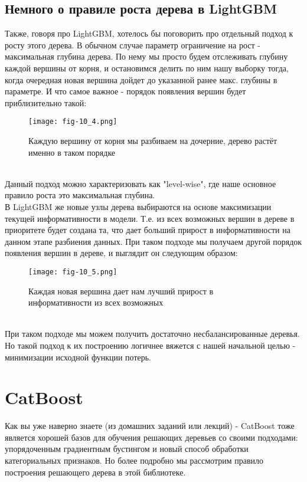 \documentclass[12pt,fleqn]{article}
\begin{document}
\subsection{Немного о правиле роста дерева в LightGBM}
Также, говоря про LightGBM, хотелось бы поговорить про отдельный подход к росту этого дерева. В обычном случае параметр ограничение на рост - максимальная глубина дерева. По нему мы просто будем отслеживать глубину каждой вершины от корня, и остановимся делить по ним нашу выборку тогда, когда очередная новая вершина дойдет до указанной ранее макс. глубины в параметре. И что самое важное - порядок появления вершин будет приблизительно такой:
\begin{figure}[h]
	\centering
	\texttt{[image: fig-10\_4.png]}
	\caption{Каждую вершину от корня мы разбиваем на дочерние, дерево растёт именно в таком порядке}
	\label{fig:terms_4}
\end{figure}\\
Данный подход можно характеризовать как "level-wise", где наше основное правило роста это максимальная глубина.\\

В LightGBM же новые узлы дерева выбираются на основе максимизации текущей информативности в модели. Т.е. из всех возможных вершин в дереве в приоритете будет создана та, что дает больший прирост в информативности на данном этапе разбиения данных. При таком подходе мы получаем другой порядок появления вершин в дереве, и выглядит он следующим образом:
\begin{figure}[h]
	\centering
	\texttt{[image: fig-10\_5.png]}
	\caption{Каждая новая вершина дает нам лучший прирост в информативности из всех возможных}
	\label{fig:terms_5}
\end{figure}\\
При таком подходе мы можем получить достаточно несбалансированные деревья. Но такой подход к их построению логичнее вяжется с нашей начальной целью - минимизации исходной функции потерь.

\section{CatBoost}
Как вы уже наверно знаете (из домашних заданий или лекций) - CatBoost тоже является хорошей базов для обучения решающих деревьев со своими подходами: упорядоченным градиентным бустингом и новый способ обработки категориальных признаков. Но более подробно мы рассмотрим правило построения решающего дерева в этой библиотеке.\\
\end{document}
